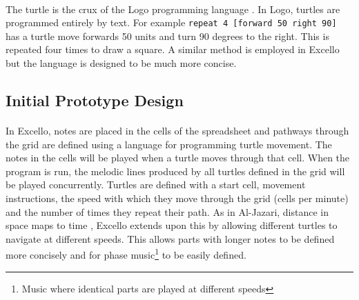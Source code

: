 \paragraph{} The turtle is the crux of the Logo programming language \cite{goldman:turtle}. In Logo, turtles are programmed entirely by text. For example \texttt{repeat 4 [forward 50 right 90]} has a turtle move forwards 50 units and turn 90 degrees to the right. This is repeated four times to draw a square. A similar method is employed in Excello but the language is designed to be much more concise.

\subsection{Initial Prototype Design}

\paragraph{} In Excello, notes are placed in the cells of the spreadsheet and pathways through the grid are defined using a language for programming turtle movement. The notes in the cells will be played when a turtle moves through that cell. When the program is run, the melodic lines produced by all turtles defined in the grid will be played concurrently. Turtles are defined with a start cell, movement instructions, the speed with which they move through the grid (cells per minute) and the number of times they repeat their path. As in Al-Jazari, distance in space maps to time \cite{mclean:texture}, Excello extends upon this by allowing different turtles to navigate at different speeds. This allows parts with longer notes to be defined more concisely and for phase music\footnote{Music where identical parts are played at different speeds} to be easily defined.

